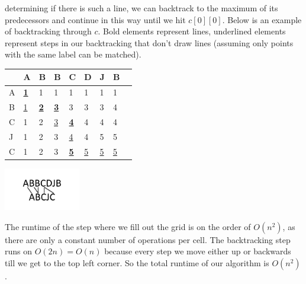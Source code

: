 \documentclass[11pt]{article}
\begin{document}
\begin{enumerate}
			determining if there is such a line, we can backtrack to
			the maximum of its predecessors and continue in this way
			until we hit $c[0][0]$. Below is an example of
			backtracking through $c$. Bold elements represent lines,
			underlined elements represent steps in our backtracking
			that don't draw lines (assuming only points with the
			same label can be matched). 
			\begin{center}
			\begin{tabular}{l| l l l l l l l l}
				&  A & B & B & C & D & J & B\\
				\hline
				A  & \underline{\textbf{1}} & 1 & 1 & 1 & 1 & 1 & 1\\
				B  & \underline{1} & \underline{\textbf{2}} &
				\underline{\textbf{3}} & 3 & 3 & 3 & 4\\
				C  & 1 & 2 & \underline{3} &
				\underline{\textbf{4}} & 4 & 4 & 4\\
				J  & 1 & 2 & 3 & \underline{4} & 4 & 5 & 5\\
				C  & 1 & 2 & 3 & \underline{\textbf{5}} & \underline{5} & \underline{5} & \underline{5}\\
			\end{tabular}
			\includegraphics[width=0.25\textwidth]{images/fig2}
			\end{center}
			The runtime of the step where we fill out the grid is on
			the order of $O(n^2)$, as there are only a constant
			number of operations per cell. The backtracking step
			runs on  $O(2n) = O(n)$ because every step we move either up
			or backwards till we get to the top left corner. So the
			total runtime of our algorithm is $O(n^2)$.
			

\end{enumerate}
\end{document}
